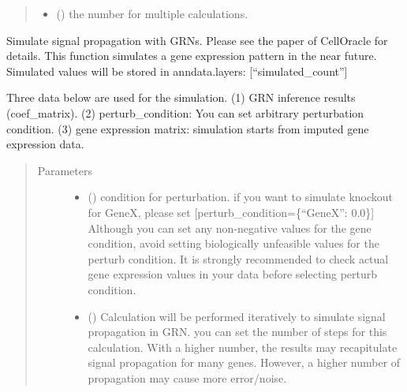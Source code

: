 \documentclass[letterpaper,10pt,english]{sphinxmanual}
\begin{document}
\begin{fulllineitems}
\begin{fulllineitems}
\begin{quote}
\begin{description}
\begin{itemize}
\item {} 
 () \textendash{} the number for multiple calculations.

\end{itemize}

\end{description}\end{quote}

\end{fulllineitems}


\begin{fulllineitems}
\label{\detokenize{modules/celloracle:celloracle.Oracle.simulate_shift}}
Simulate signal propagation with GRNs. Please see the paper of CellOracle for details.
This function simulates a gene expression pattern in the near future.
Simulated values will be stored in anndata.layers: {[}“simulated\_count”{]}

Three data below are used for the simulation.
(1) GRN inference results (coef\_matrix).
(2) perturb\_condition: You can set arbitrary perturbation condition.
(3) gene expression matrix: simulation starts from imputed gene expression data.
\begin{quote}\begin{description}
\item[{Parameters}] \leavevmode\begin{itemize}
\item {} 
 () \textendash{} condition for perturbation.
if you want to simulate knockout for GeneX, please set {[}perturb\_condition=\{“GeneX”: 0.0\}{]}
Although you can set any non-negative values for the gene condition, avoid setting biologically unfeasible values for the perturb condition.
It is strongly recommended to check actual gene expression values in your data before selecting perturb condition.

\item {} 
 () \textendash{} Calculation will be performed iteratively to simulate signal propagation in GRN.
you can set the number of steps for this calculation.
With a higher number, the results may recapitulate signal propagation for many genes.
However, a higher number of propagation may cause more error/noise.


\end{itemize}
\end{description}
\end{quote}
\end{fulllineitems}
\end{fulllineitems}
\end{document}
